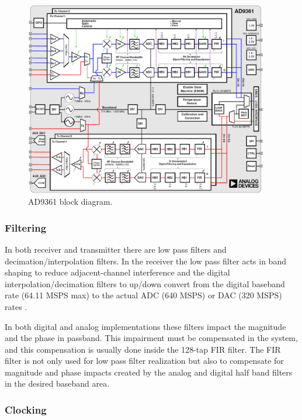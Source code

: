 \begin{figure}[htbp]
    \centering
    \includegraphics[width=0.95\textwidth]{./figures/ad9361_block_diagram}
    \caption{ AD9361 block diagram.
    \label{fig:ad9361blk}}
\end{figure}

\subsubsection{Filtering}

In both receiver and transmitter there are low pass filters and
decimation/interpolation filters. In the receiver the low pass filter acts in
band shaping to reduce adjacent-channel interference and the digital
interpolation/decimation filters to up/down convert from the digital baseband
rate (64.11 MSPS max) to the actual ADC (640 MSPS) or DAC (320 MSPS) rates
\cite{web:ad9361wiki}.

In both digital and analog implementations these filters impact the magnitude
and the phase in passband. This impairment must be compensated in the system,
and this compensation is usually done inside the 128-tap FIR filter. The FIR
filter is not only used for low pass filter realization but also to compensate
for magnitude and phase impacts created by the analog and digital half band
filters in the desired baseband area.

\subsubsection{Clocking}


